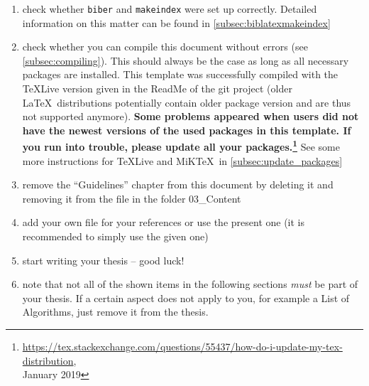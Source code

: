 \begin{enumerate}
	\item check whether \verb+biber+ and \verb+makeindex+ were set up correctly. Detailed information on this matter can be found in \autoref{subsec:biblatexmakeindex}
	\item check whether you can compile this document without errors (see \autoref{subsec:compiling}). This should always be the case as long as all necessary packages are installed. This template was successfully compiled with the \TeX Live version given in the ReadMe of the git project (older \LaTeX\ distributions potentially contain older package version and are thus not supported anymore). \textbf{Some problems appeared when users did not have the newest versions of the used packages in this template. If you run into trouble, please update all your packages.\footnote{\url{https://tex.stackexchange.com/questions/55437/how-do-i-update-my-tex-distribution}, \\ January 2019}} See some more instructions for \TeX Live and MiK\TeX\ in \autoref{subsec:update_packages}
	\item remove the \enquote{Guidelines} chapter from this document by deleting it and removing it from the  file in the folder 03\_Content
	\item add your own  file for your references or use the present one	(it is recommended to simply use the given one)
	\item start writing your thesis -- good luck!
	\item note that not all of the shown items in the following sections \emph{must} be part of your thesis. If a certain aspect does not apply to you, for example a List of Algorithms, just remove it from the thesis.
\end{enumerate}
